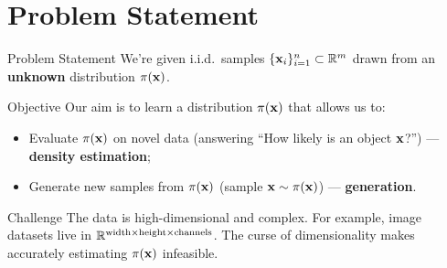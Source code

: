 \documentclass{beamer}
\begin{document}
\section{Problem Statement}
\begin{frame}{Problem Statement}
	We're given i.i.d.\ samples $\{\mathbf{x}_i\}_{i=1}^n \subset \mathbb{R}^m$ drawn from an \textbf{unknown} distribution $\pi(\mathbf{x})$.
	\eqpause
	\begin{block}{Objective}
		Our aim is to learn a distribution $\pi(\mathbf{x})$ that allows us to: 
		\begin{itemize}
		    \item Evaluate $\pi(\mathbf{x})$ on novel data (answering ``How likely is an object $\mathbf{x}$?'') --- \textbf{density estimation}; 
		    \eqpause
		    \item Generate new samples from $\pi(\mathbf{x})$ (sample $\mathbf{x} \sim \pi(\mathbf{x})$) --- \textbf{generation}.
		\end{itemize}
	\end{block}
	\eqpause
	\begin{block}{Challenge}
		The data is high-dimensional and complex. For example, image datasets live in $\mathbb{R}^{\text{width} \times \text{height} \times \text{channels}}$. The curse of dimensionality makes accurately estimating $\pi(\mathbf{x})$ infeasible.
	\end{block}
\end{frame}
\end{document}
